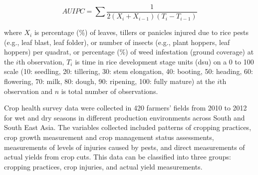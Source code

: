 \begin{equation}
AUIPC = \sum{\frac{1}{2(X_{i} + X_{i-1})(T_{i} - T_{i-1})}}
\end{equation}

where $X_i$ is percentage (\%) of leaves, tillers or panicles injured due to rice pests (e.g., leaf blast, leaf folder), or number of insects (e.g., plant hoppers, leaf hoppers) per quadrat, or percentage (\%) of weed infestation (ground coverage) at the $i$th observation, $T_i$ is time in rice development stage units (dsu) on a 0 to 100 scale (10: seedling, 20: tillering, 30: stem elongation, 40: booting, 50: heading, 60: flowering, 70: milk, 80: dough, 90: ripening, 100: fully mature) at the $i$th observation and $n$ is total number of observations.


Crop health survey data were collected in 420 farmers' fields from 2010 to 2012 for wet and dry seasons in different production environments across South and South East Asia. The variables collected included patterns of cropping practices, crop growth measurement and crop management status assessments, measurements of levels of injuries caused by pests, and direct measurements of actual yields from crop cuts. This data can be classified into three groups: cropping practices, crop injuries, and actual yield measurements.
